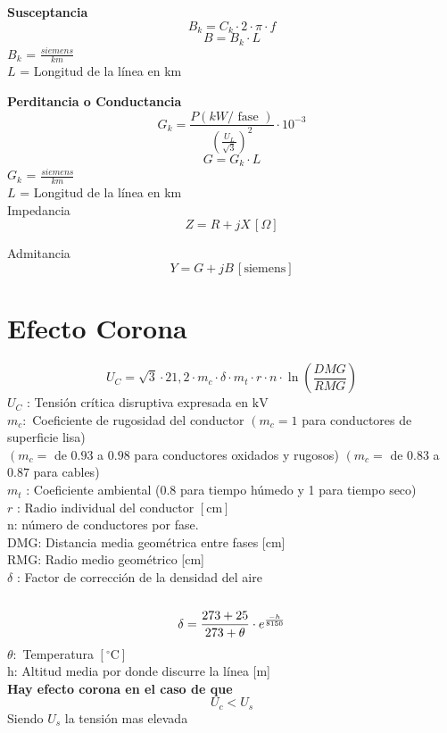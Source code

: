 \documentclass[10pt,a4paper]{article}
\begin{document}
\textbf{Susceptancia}
\\
$$
B_k = C_k \cdot 2\cdot \pi \cdot f
$$
$$
B = B_k \cdot L
$$
$B_k$ = $\frac{siemens}{km}$ \\
$L$ = Longitud de la línea en km

\textbf{Perditancia o Conductancia}
\\
$$
G_k=\frac{P(k W / \text { fase })}{\left(\frac{U_{L}}{\sqrt{3}}\right)^{2}} \cdot 10^{-3}
$$
$$
G = G_k \cdot L
$$
$G_k$ = $\frac{siemens}{km}$ \\
$L$ = Longitud de la línea en km
\\

Impedancia
$$
Z = R + jX \, \left[ \Omega \right]
$$

Admitancia
$$
Y = G + jB \, \left[ \text{siemens} \right]
$$
\newpage
\section{Efecto Corona}
$$
U_{C}=\sqrt{3} \cdot 21,2 \cdot m_{c} \cdot \delta \cdot m_{t} \cdot r \cdot n \cdot \ln \left(\frac{D M G}{R M G}\right)
$$
$U_{C}$ : Tensión crítica disruptiva expresada en $\mathrm{kV}$ \\
$m_{c}:$ Coeficiente de rugosidad del conductor $\left(m_{c}=1\right.$ para conductores de superficie lisa) \\ $\left(m_{c}=\right.$ de $0.93$ a $0.98$ para conductores oxidados y rugosos) $\left(m_{c}=\right.$ de $0.83$ a $0.87$ para cables) \\
$m_{t}$ : Coeficiente ambiental (0.8 para tiempo húmedo y 1 para tiempo seco)\\
$r$ : Radio individual del conductor $[\mathrm{cm}]$\\
n: número de conductores por fase. \\
DMG: Distancia media geométrica entre fases [cm] \\
RMG: Radio medio geométrico [cm]\\
$\delta$ : Factor de corrección de la densidad del aire\\
\\
$$
\delta=\frac{273+25}{273+\theta} \cdot e^{\frac{-h}{8150}}\\
$$
$\theta:$ Temperatura $\left[{ }^{\circ} \mathrm{C}\right]$\\
h: Altitud media por donde discurre la línea [m]
\\
\textbf{Hay efecto corona en el caso de que}
$$
U_c < U_s
$$
Siendo $U_s$ la tensión mas elevada 
\\
\end{document}
